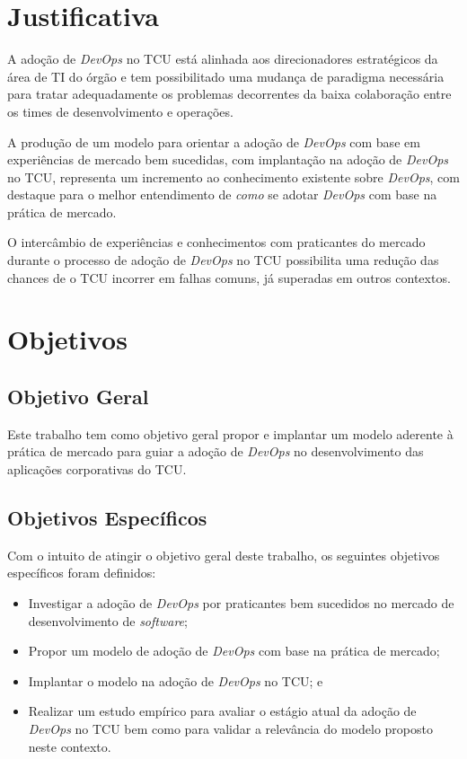 \section{Justificativa}%

A adoção de \textit{DevOps} no \acrshort{TCU} está alinhada aos direcionadores
estratégicos da área de \acrshort{TI} do órgão e tem possibilitado uma
mudança de paradigma necessária para tratar adequadamente os problemas
decorrentes da baixa colaboração entre os times de desenvolvimento e operações.

A produção de um modelo para orientar a adoção de \textit{DevOps} com base em
experiências de mercado bem sucedidas, com implantação na adoção de
\textit{DevOps} no \acrshort{TCU}, representa um
incremento ao conhecimento existente sobre \textit{DevOps}, com destaque
para o melhor entendimento de \emph{como} se adotar \textit{DevOps} com base na
prática de mercado.

O intercâmbio de experiências e conhecimentos com praticantes do mercado
durante o processo de adoção de \textit{DevOps} no TCU possibilita uma redução
das chances de o \acrshort{TCU} incorrer em falhas comuns, já superadas em
outros contextos.

\section{Objetivos}

\subsection{Objetivo Geral}

Este trabalho tem como objetivo geral propor e implantar um modelo aderente à prática
de mercado para guiar a adoção de \textit{DevOps} no desenvolvimento das
aplicações corporativas do \acrshort{TCU}.

\subsection{Objetivos Específicos}
Com o intuito de atingir o objetivo geral deste trabalho, os seguintes objetivos
específicos foram definidos:

\begin{itemize}
\item Investigar a adoção de \textit{DevOps} por praticantes bem sucedidos no
mercado de desenvolvimento de \textit{software};
\item Propor um modelo de adoção de \textit{DevOps} com base na prática de mercado;
\item Implantar o modelo na adoção de \textit{DevOps} no \acrshort{TCU}; e
\item Realizar um estudo empírico para avaliar o estágio atual da adoção de
\textit{DevOps} no \acrshort{TCU} bem como para validar a relevância do modelo
proposto neste contexto.
\end{itemize}

